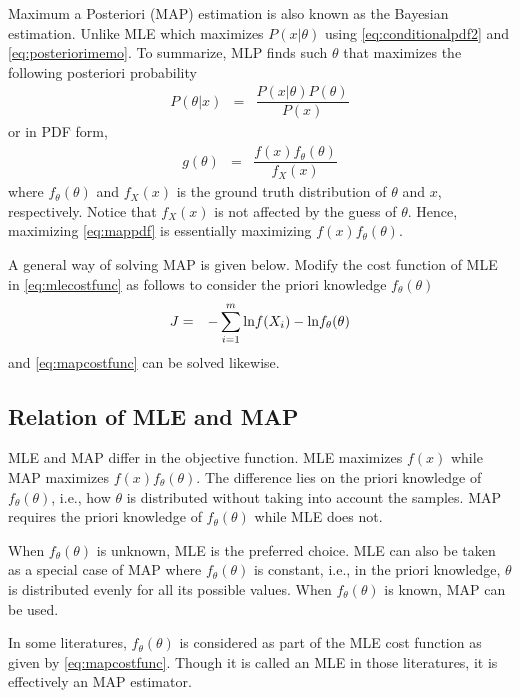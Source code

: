 Maximum a Posteriori (MAP) estimation is also known as the Bayesian estimation. Unlike MLE which maximizes $P(x|\theta)$ using \eqref{eq:conditionalpdf2} and \eqref{eq:posteriorimemo}. To summarize, MLP finds such $\theta$ that maximizes the following posteriori probability
\begin{eqnarray}
	P(\theta|x) &=& \dfrac{P(x|\theta)P(\theta)}{P(x)} \nonumber
\end{eqnarray}
or in PDF form,
\begin{eqnarray}
	g(\theta) &=& \dfrac{f(x)f_{\theta}(\theta)}{f_{X}(x)} \label{eq:mappdf}
\end{eqnarray}
where $f_{\theta}(\theta)$ and $f_{X}(x)$ is the ground truth distribution of $\theta$ and $x$, respectively. Notice that $f_{X}(x)$ is not affected by the guess of $\theta$. Hence, maximizing \eqref{eq:mappdf} is essentially maximizing $f(x)f_{\theta}(\theta)$.

A general way of solving MAP is given below. Modify the cost function of MLE in \eqref{eq:mlecostfunc} as follows to consider the priori knowledge $f_\theta(\theta)$
\begin{eqnarray}
	J &=& -\sum_{i=1}^{m}\textup{ln}f(X_i) - \textup{ln}f_\theta(\theta) \label{eq:mapcostfunc}
\end{eqnarray}
and \eqref{eq:mapcostfunc} can be solved likewise.

\subsection{Relation of MLE and MAP}

MLE and MAP differ in the objective function. MLE maximizes $f(x)$ while MAP maximizes $f(x)f_{\theta}(\theta)$. The difference lies on the priori knowledge of $f_{\theta}(\theta)$, i.e., how $\theta$ is distributed without taking into account the samples. MAP requires the priori knowledge of $f_{\theta}(\theta)$ while MLE does not.

When $f_{\theta}(\theta)$ is unknown, MLE is the preferred choice. MLE can also be taken as a special case of MAP where $f_\theta(\theta)$ is constant, i.e., in the priori knowledge, $\theta$ is distributed evenly for all its possible values. When $f_{\theta}(\theta)$ is known, MAP can be used.

In some literatures, $f_{\theta}(\theta)$ is considered as part of the MLE cost function as given by \eqref{eq:mapcostfunc}. Though it is called an MLE in those literatures, it is effectively an MAP estimator.

